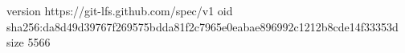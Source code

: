 version https://git-lfs.github.com/spec/v1
oid sha256:da8d49d39767f269575bdda81f2c7965e0eabae896992c1212b8cde14f33353d
size 5566
